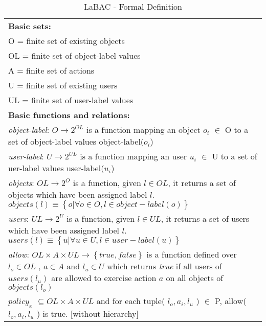\begin{table*}[t] \footnotesize
	\centering
	\caption{LaBAC - Formal Definition}
	\label{table:labac-formal-model}
	\begin{tabular}{p{\textwidth}}
		
		\hline
		\textbf{Basic sets:}\\
		
		O = finite set of existing objects \\
		OL = finite set of object-label values\\
		A = finite set of actions\\
		U = finite set of existing users\\
		UL = finite set of user-label values\\
		
		\textbf{Basic functions and relations:}\\
		
		\emph{object-label}: $O \rightarrow 2^{OL} $ is a function mapping an object $o_{i}$ $\in$ O to a set of object-label values object-label($o_{i}$)\\
		
		\emph{user-label}: $U \rightarrow 2^{UL} $ is a function mapping an user $u_{i}$ $\in$ U to a set of uer-label values user-label($u_{i}$)\\
		
		\emph{objects}: $OL \rightarrow 2^ {O}$ is a function, given $ l \in OL $, it returns a set of objects which have been assigned label $l$. $objects(l) \equiv \left\{   o | \forall  o \in O, l \in object-label(o)       \right\}$ \\
		
		\emph{users}: $UL \rightarrow 2^ {U}$ is a function, given $ l \in UL $, it returns  a set of users which have been assigned label $l$. $users(l) \equiv \left\{   u | \forall  u \in U, l \in user-label(u)       \right\}$ \\
		
		\emph{allow}: $OL \times A \times UL \rightarrow \left\{true, false \right\}$ is a function defined over $l_{o} \in OL$ , $a \in A$ and $l_{u} \in U$ which returns \emph{true} if all users of  $users(l_{u})$ are allowed to exercise action $a$ on all objects of $objects(l_{o})$ \\
		
		\emph{$policy_{x}$} $ \subseteq OL \times A \times UL$ and for each tuple( $l_{o}, a_{i}, l_{u}$ ) $\in$ P, allow(  $l_{o}, a_{i}, l_{u}$ ) is true. [without hierarchy] \\
		

\end{tabular}
\end{table*}
